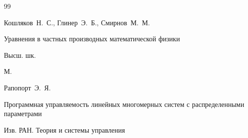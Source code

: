 \begin{thebibliography}{99}

















\by Кошляков~Н.~С., Глинер~Э.~Б., Смирнов~М.~М. 

\book Уравнения в частных производных математической физики


\publ Высш. шк.

\publaddr М.















\by Рапопорт~Э.~Я.

\paper Программная управляемость линейных многомерных систем с распределенными параметрами

\jour Изв. РАН. Теория и системы управления


\end{thebibliography}
